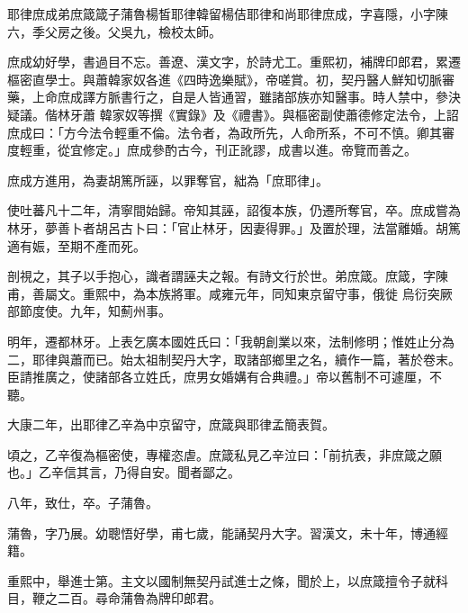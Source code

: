 
\begin{pinyinscope}

 耶律庶成弟庶箴箴子蒲魯楊皙耶律韓留楊佶耶律和尚耶律庶成，字喜隱，小字陳六，季父房之後。父吳九，檢校太師。



 庶成幼好學，書過目不忘。善遼、漢文字，於詩尤工。重熙初，補牌印郎君，累遷樞密直學士。與蕭韓家奴各進《四時逸樂賦》，帝嗟賞。初，契丹醫人鮮知切脈審藥，上命庶成譯方脈書行之，自是人皆通習，雖諸部族亦知醫事。時人禁中，參決疑議。偕林牙蕭
 韓家奴等撰《實錄》及《禮書》。與樞密副使蕭德修定法令，上詔庶成曰：「方今法令輕重不倫。法令者，為政所先，人命所系，不可不慎。卿其審度輕重，從宜修定。」庶成參酌古今，刊正訛謬，成書以進。帝覽而善之。



 庶成方進用，為妻胡篤所誣，以罪奪官，絀為「庶耶律」。



 使吐蕃凡十二年，清寧間始歸。帝知其誣，詔復本族，仍遷所奪官，卒。庶成嘗為林牙，夢善卜者胡呂古卜曰：「官止林牙，因妻得罪。」及置於理，法當離婚。胡篤適有娠，至期不產而死。



 剖視之，其子以手抱心，識者謂誣夫之報。有詩文行於世。弟庶箴。庶箴，字陳甫，善屬文。重熙中，為本族將軍。咸雍元年，同知東京留守事，俄徙
 烏衍突厥部節度使。九年，知薊州事。



 明年，遷都林牙。上表乞廣本國姓氏曰：「我朝創業以來，法制修明；惟姓止分為二，耶律與蕭而已。始太祖制契丹大字，取諸部鄉里之名，續作一篇，著於卷末。臣請推廣之，使諸部各立姓氏，庶男女婚媾有合典禮。」帝以舊制不可遽厘，不聽。



 大康二年，出耶律乙辛為中京留守，庶箴與耶律孟簡表賀。



 頃之，乙辛復為樞密使，專權恣虐。庶箴私見乙辛泣曰：「前抗表，非庶箴之願也。」乙辛信其言，乃得自安。聞者鄙之。



 八年，致仕，卒。子蒲魯。



 蒲魯，字乃展。幼聰悟好學，甫七歲，能誦契丹大字。習漢文，未十年，博通經籍。



 重熙中，舉進士第。主文以國制無契丹試進士之條，聞於上，以庶箴擅令子就科目，鞭之二百。尋命蒲魯為牌印郎君。




\end{pinyinscope}
